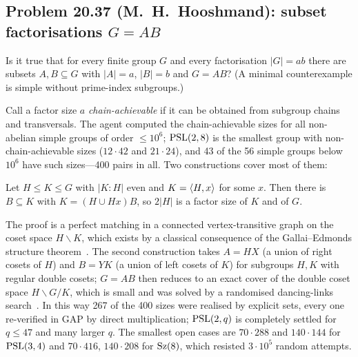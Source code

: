 \subsection{Problem 20.37 (M.~H.~Hooshmand): subset factorisations $G=AB$}
\begin{problem}[20.37]
Is it true that for every finite group $G$ and every factorisation $|G|=ab$ there are subsets $A,B\subseteq G$ with
$|A|=a$, $|B|=b$ and $G=AB$? (A minimal counterexample is simple without prime-index subgroups.)
\end{problem}
Call a factor size $a$ \emph{chain-achievable} if it can be obtained from subgroup chains and transversals. The
agent computed the chain-achievable sizes for all non-abelian simple groups of order $\le 10^6$; $\mathrm{PSL}(2,8)$ is
the smallest group with non-chain-achievable sizes ($12\cdot 42$ and $21\cdot 24$), and 43 of the 56 simple groups
below $10^6$ have such sizes---400 pairs in all. Two constructions cover most of them:
\begin{theorem}\label{thm:2037}
Let $H\le K\le G$ with $|K:H|$ even and $K=\langle H,x\rangle$ for some $x$. Then there is $B\subseteq K$ with
$K=(H\cup Hx)B$, so $2|H|$ is a factor size of $K$ and of $G$.
\end{theorem}
The
proof is a perfect matching in a connected vertex-transitive graph on the coset space $H\backslash K$, which
exists by a classical consequence of the Gallai--Edmonds structure theorem~\cite{LP}. The second construction takes $A=HX$ (a union of right cosets of
$H$) and $B=YK$ (a union of left cosets of $K$) for subgroups $H,K$ with regular double cosets; $G=AB$ then reduces
to an exact cover of the double coset space $H\backslash G/K$, which is small and was solved by a randomised
dancing-links search~\cite{Knuth}. In this way 267 of the 400 sizes were realised by explicit sets, every one re-verified in
GAP by direct multiplication; $\mathrm{PSL}(2,q)$ is completely settled for $q\le 47$ and many larger $q$. The smallest
open cases are $70\cdot 288$ and $140\cdot 144$ for $\mathrm{PSL}(3,4)$ and $70\cdot 416$, $140\cdot 208$ for $\mathrm{Sz}(8)$,
which resisted $3\cdot 10^5$ random attempts.


